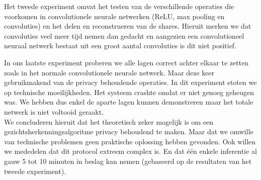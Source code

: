 Het tweede experiment omvat het testen van de verschillende operaties die voorkomen in convolutionele neurale netwerken (ReLU, max pooling en convoluties) en het delen en reconstrueren van de shares. Hieruit merken we dat convoluties veel meer tijd nemen dan gedacht en aangezien een convolutioneel neuraal netwerk bestaat uit een groot aantal convoluties is dit niet positief.

In ons laatste experiment proberen we alle lagen correct achter elkaar te zetten zoals in het normale convolutionele neurale netwerk. Maar deze keer gebruikmakend van de privacy behoudende operaties. In dit experiment stoten we op technische moeilijkheden. Het systeem crashte omdat er niet genoeg geheugen was. We hebben dus enkel de aparte lagen kunnen demonstreren maar het totale netwerk is niet voltooid geraakt.\\

We concluderen hieruit dat het theoretisch zeker mogelijk is om een gezichtsherkenningsalgoritme privacy behoudend te maken. Maar dat we omwille van technische problemen geen praktische oplossing hebben gevonden. Ook willen we mededelen dat dit protocol extreem complex is. En dat \'e\'en enkele inferentie al gauw 5 tot 10 minuten in beslag kan nemen (gebaseerd op de resultaten van het tweede experiment).
